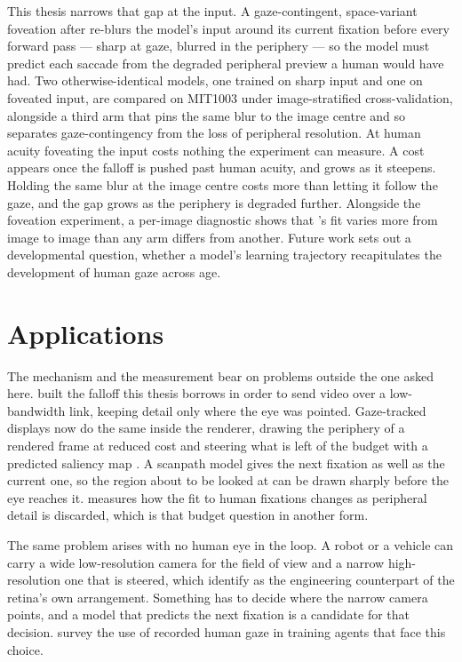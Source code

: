 This thesis narrows that gap at the input. A gaze-contingent, space-variant foveation after
\citet{geislerperry1998} re-blurs the model's input around its current fixation before every forward pass
--- sharp at gaze, blurred in the periphery --- so the model must predict each saccade
from the degraded peripheral preview a human would have had. Two otherwise-identical models, one trained on sharp
input and one on foveated input, are compared on MIT1003 \citep{judd2009mit1003} under image-stratified
cross-validation, alongside a third arm that pins the same blur to the image centre and so
separates gaze-contingency from the loss of peripheral resolution. At human acuity foveating the input costs
nothing the experiment can measure. A cost appears once the falloff is pushed past human
acuity, and grows as it steepens. Holding the same blur at the image centre costs more than letting it
follow the gaze, and the gap grows as the periphery is degraded further.
Alongside the foveation experiment, a per-image diagnostic shows
that \dg{}'s fit varies more from image to image than any arm differs from another. Future work sets out a
developmental question, whether a model's learning trajectory recapitulates the development of human
gaze across age.

\section{Applications}
\label{sec:intro-applications}

The mechanism and the measurement bear on problems outside the one asked here. \citet{geislerperry1998}
built the falloff this thesis borrows in order to send video over a low-bandwidth link, keeping detail
only where the eye was pointed. Gaze-tracked displays now do the same inside the renderer, drawing the
periphery of a rendered frame at reduced cost \citep{guenter2012foveated, patney2016foveated} and
steering what is left of the budget with a predicted saliency map \citep{gao2025foveatedpathtracing}. A
scanpath model gives the next fixation as well as the current one, so the region about to be looked at
can be drawn sharply before the eye reaches it.  measures how the fit to human fixations
changes as peripheral detail is discarded, which is that budget question in another form.

The same problem arises with no human eye in the loop. A robot or a vehicle can carry a wide
low-resolution camera for the field of view and a narrow high-resolution one that is steered, which
\citet{wloka2018starfc} identify as the engineering counterpart of the retina's own arrangement.
Something has to decide where the narrow camera points, and a model that predicts the next fixation is a
candidate for that decision. \citet{zhang2020gazereview} survey the use of recorded human gaze in
training agents that face this choice.

